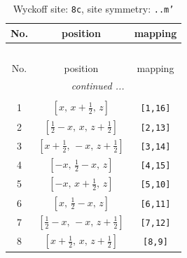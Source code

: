 \documentclass[fleqn,8pt]{jsarticle}
\begin{document}
\renewcommand{\arraystretch}{1.2}
\begin{longtable}{ccc}
\caption{Wyckoff site: {\tt 8c}, site symmetry: {\tt ..m'}}
 \\
 \hline \hline
No. & position & mapping \\ \hline \endfirsthead

\multicolumn{2}{l}{\tablename\ \thetable{}} \\
 \hline \hline
No. & position & mapping \\ \hline \endhead

 \hline \hline
\multicolumn{2}{r}{\footnotesize\it continued ...} \\ \endfoot

 \hline \hline
\multicolumn{2}{r}{} \\ \endlastfoot

1 & $\left[ x,\, x + \frac{1}{2},\, z \right]$ & {\tt [1,16]} \\ \hline
2 & $\left[ \frac{1}{2} - x,\, x,\, z + \frac{1}{2} \right]$ & {\tt [2,13]} \\ \hline
3 & $\left[ x + \frac{1}{2},\, - x,\, z + \frac{1}{2} \right]$ & {\tt [3,14]} \\ \hline
4 & $\left[ - x,\, \frac{1}{2} - x,\, z \right]$ & {\tt [4,15]} \\ \hline
5 & $\left[ - x,\, x + \frac{1}{2},\, z \right]$ & {\tt [5,10]} \\ \hline
6 & $\left[ x,\, \frac{1}{2} - x,\, z \right]$ & {\tt [6,11]} \\ \hline
7 & $\left[ \frac{1}{2} - x,\, - x,\, z + \frac{1}{2} \right]$ & {\tt [7,12]} \\ \hline
8 & $\left[ x + \frac{1}{2},\, x,\, z + \frac{1}{2} \right]$ & {\tt [8,9]} \\
\end{longtable}
\renewcommand{\arraystretch}{1.2}
\end{document}
